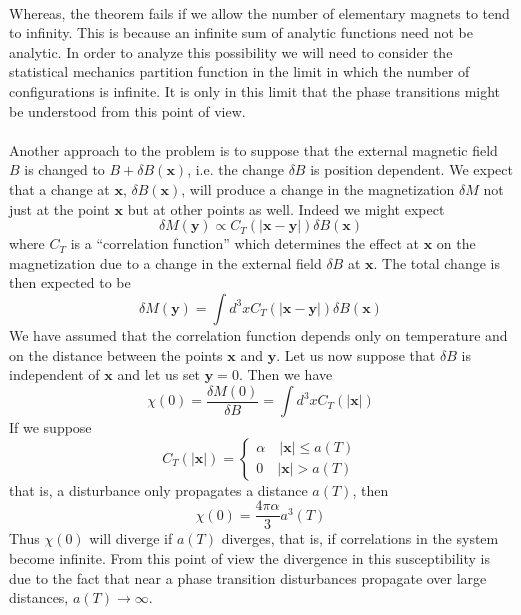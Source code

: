 \\
Whereas, the theorem fails if we allow the number of elementary magnets to tend to infinity. This is because an infinite sum of analytic functions need not be analytic. 
In order to analyze this possibility we will need to consider the statistical mechanics partition function in the limit in which the number of configurations is infinite. It is only in this limit that the phase transitions might be understood from this point of view.
\\ \\
Another approach to the problem is to suppose that the external magnetic field $B$ is changed to $B + \delta B(\bm{x})$, i.e. the change $\delta B$ is position dependent. We expect that a change at $\bm{x}$, $\delta B(\bm{x})$, will produce a change in the magnetization $\delta M$ not just at the point $\bm{x}$ but at other points as well. Indeed we might expect
\[\delta M(\bm{y}) \propto C_T(|\bm{x}-\bm{y}|)\delta B(\bm{x})\]
where $C_T$ is a ``correlation function'' which determines the effect at $\bm{x}$ on the magnetization due to a change in the external field $\delta B$ at $\bm{x}$. The total change
is then expected to be
\[\delta M(\bm{y}) = \int d^3x C_T(|\bm{x}-\bm{y}|)\delta B(\bm{x})\]
We have assumed that the correlation function depends only on temperature and on the distance between the points $\bm{x}$ and $\bm{y}$.
Let us now suppose that $\delta B$ is independent of $\bm{x}$ and let us set $\bm{y} = 0$. Then we have
\[\chi(0) = \frac{\delta M(0)}{\delta B} = \int d^3x C_T(|\bm{x}|)\]
If we suppose
\[C_T(|\bm{x}|) = \begin{cases} \alpha \quad |\bm{x}| \leq a(T) \\ 0 \quad |\bm{x}| > a(T) \end{cases}\]
that is, a disturbance only propagates a distance $a(T)$, then
\[\chi(0) = \frac{4\pi \alpha}{3} a^3(T)\]
Thus $\chi(0)$ will diverge if $a(T)$ diverges, that is, if correlations in the system become infinite. From this point of view the divergence in this susceptibility is due to the fact that near a phase transition disturbances propagate over large distances, $a(T) \to \infty$. 

